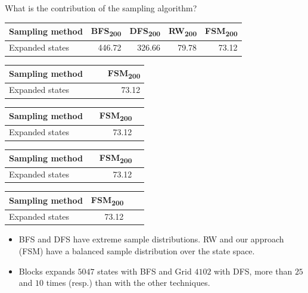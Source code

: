 \documentclass[10pt]{beamer}
\begin{document}
\begin{frame}{\small What is the contribution of the sampling algorithm?} %
\begin{table}[]
 {
\begin{tabular}{l|rrrr}
    Sampling method & BFS\textsubscript{200} & DFS\textsubscript{200} & RW\textsubscript{200} & FSM\textsubscript{200} \\
    \hline
    Expanded states & 446.72 & 326.66 & 79.78 & 73.12 \\
\end{tabular}
}
 {
\begin{tabular}{l|rrr}
    Sampling method & & & FSM\textsubscript{200} \\
    \hline
    Expanded states & & \hspace{3.4cm} & 73.12 \\
\end{tabular}
}
 {
\begin{tabular}{l|rrr}
    Sampling method & & FSM\textsubscript{200} & \\
    \hline
    Expanded states & \hspace{2cm} & 73.12 & \hspace{1cm} \\
\end{tabular}
}
 {
\begin{tabular}{l|rrr}
    Sampling method & & FSM\textsubscript{200} & \\
    \hline
    Expanded states & \hspace{0.5cm} & 73.12 & \hspace{2cm} \\
\end{tabular}
}
 {
\begin{tabular}{l|rrr}
    Sampling method & FSM\textsubscript{200} & & \\
    \hline
    Expanded states & 73.12 & & \hspace{2cm} \\
\end{tabular}
}
\end{table}

 {
\begin{itemize}
    \item BFS and DFS have extreme sample distributions. RW and our approach (FSM) have a balanced sample distribution over the state space.
    \item Blocks expands $5047$ states with BFS and Grid $4102$ with DFS, more than $25$ and $10$ times (resp.) than with the other techniques.
\end{itemize}
}
 {
\vspace{3.3cm}
}
\end{frame}
\end{document}

